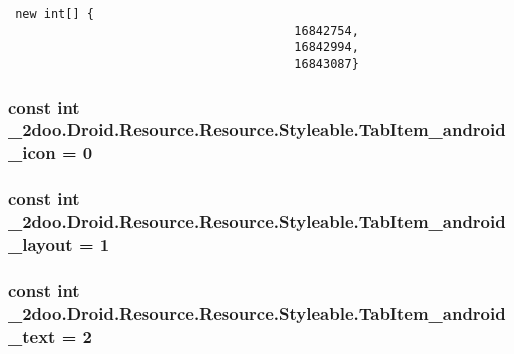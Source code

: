 \begin{Code}\begin{verbatim} new int[] {
                                        16842754,
                                        16842994,
                                        16843087}
\end{verbatim}
\end{Code}
\hypertarget{class__2doo_1_1_droid_1_1_resource_1_1_styleable_a8673c2ed978e70d92aed22939be2765}{
\subsubsection[{TabItem\_\-android\_\-icon}]{\setlength{\rightskip}{0pt plus 5cm}const int \_\-2doo.Droid.Resource.Resource.Styleable.TabItem\_\-android\_\-icon = 0}}
\label{class__2doo_1_1_droid_1_1_resource_1_1_styleable_a8673c2ed978e70d92aed22939be2765}


\hypertarget{class__2doo_1_1_droid_1_1_resource_1_1_styleable_0c69e292d8e94b2051b2ec3353764a8d}{
\subsubsection[{TabItem\_\-android\_\-layout}]{\setlength{\rightskip}{0pt plus 5cm}const int \_\-2doo.Droid.Resource.Resource.Styleable.TabItem\_\-android\_\-layout = 1}}
\label{class__2doo_1_1_droid_1_1_resource_1_1_styleable_0c69e292d8e94b2051b2ec3353764a8d}


\hypertarget{class__2doo_1_1_droid_1_1_resource_1_1_styleable_0f832ffc7e09a2c0407329c58e80eb6b}{
\subsubsection[{TabItem\_\-android\_\-text}]{\setlength{\rightskip}{0pt plus 5cm}const int \_\-2doo.Droid.Resource.Resource.Styleable.TabItem\_\-android\_\-text = 2}}
\label{class__2doo_1_1_droid_1_1_resource_1_1_styleable_0f832ffc7e09a2c0407329c58e80eb6b}


